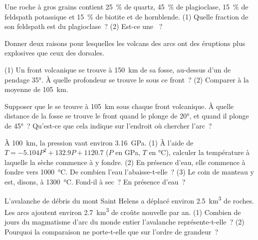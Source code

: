 \begin{exercise}[$\star$]\label{exo:g12:subduction-magmatism:4}
Une roche à gros grains contient \qty{25}{\percent} de quartz,
\qty{45}{\percent} de plagioclase, \qty{15}{\percent} de feldspath
potassique et \qty{15}{\percent} de biotite et de hornblende. (1) Quelle
fraction de son feldspath est du plagioclase~? (2) Est-ce une
~?
\end{exercise}

\begin{exercise}[$\star$]\label{exo:g12:subduction-magmatism:5}
Donner deux raisons pour lesquelles les volcans des arcs ont des éruptions
plus explosives que ceux des dorsales.
\end{exercise}

\begin{exercise}[$\star\star$]\label{exo:g12:subduction-magmatism:6}
(1) Un front volcanique se trouve à \qty{150}{km} de sa fosse, au-dessus
d'un  de pendage \ang{35}. À quelle profondeur se trouve
le  sous ce front~? (2) Comparer à la moyenne de \qty{105}{km}.
\end{exercise}

\begin{exercise}[$\star\star$]\label{exo:g12:subduction-magmatism:7}
Supposer que le  se trouve à \qty{105}{km} sous chaque
front volcanique. À quelle distance de la fosse se trouve le front quand le
 plonge de \ang{20}, et quand il plonge de \ang{45}~? Qu'est-ce que
cela indique sur l'endroit où chercher l'arc~?
\end{exercise}

\begin{exercise}[$\star\star$]\label{exo:g12:subduction-magmatism:8}
À \qty{100}{km}, la pression vaut environ \qty{3.16}{GPa}. (1) À l'aide de $T =
-5.104P^2 + 132.9P + 1120.7$ ($P$ en \unit{GPa}, $T$ en \unit{\celsius}),
calculer la température à laquelle la  sèche commence à y
fondre. (2) En présence d'eau, elle commence à fondre vers
\qty{1000}{\celsius}. De combien l'eau l'abaisse-t-elle~? (3) Le coin de
manteau y est, disons, à \qty{1300}{\celsius}. Fond-il à sec~? En présence
d'eau~?
\end{exercise}

\begin{exercise}[$\star\star$]\label{exo:g12:subduction-magmatism:9}
L'avalanche de débris du mont Saint Helens a déplacé environ
\qty{2.5}{km^3} de roches. Les arcs ajoutent environ \qty{2.7}{km^3} de
croûte nouvelle par an. (1) Combien de jours du magmatisme d'arc du monde
entier l'avalanche représente-t-elle~? (2) Pourquoi la comparaison ne
porte-t-elle que sur l'ordre de grandeur~?
\end{exercise}

